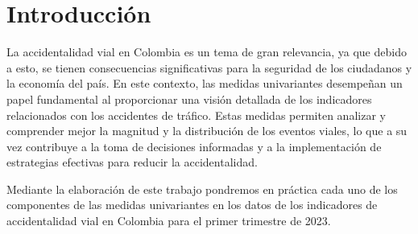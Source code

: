 \section*{Introducci\'on}
La accidentalidad vial en Colombia es un tema de gran relevancia, ya que debido a esto, se tienen consecuencias significativas para la seguridad de los ciudadanos y la economía del país. En este contexto, las medidas univariantes desempeñan un papel fundamental al proporcionar una visión detallada de los indicadores relacionados con los accidentes de tráfico. Estas medidas permiten analizar y comprender mejor la magnitud y la distribución de los eventos viales, lo que a su vez contribuye a la toma de decisiones informadas y a la implementación de estrategias efectivas para reducir la accidentalidad.\par
Mediante la elaboración de este trabajo pondremos en práctica cada uno de los componentes de las medidas univariantes en los datos de los indicadores de accidentalidad vial en Colombia para el primer trimestre de 2023.
\newpage